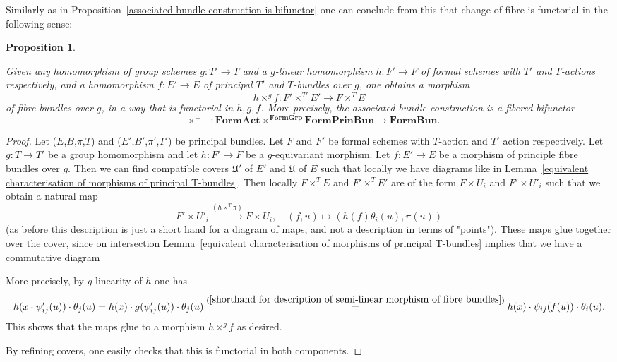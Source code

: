 \documentclass[11pt,oneside]{amsart}
\newtheorem{proposition}[theorem]{Proposition}
\theoremstyle{definition}
\theoremstyle{remark}
\begin{document}
	
	Similarly as in Proposition~\ref{associated bundle construction is bifunctor} one can conclude from this that change of fibre is functorial in the following sense:
	
	\begin{proposition}\label{associated bundle construction in the semi-linear case is a sort of fibered bifunctor}
		
		Given any homomorphism of group schemes $g:T'\rightarrow T$ and a $g$-linear homomorphism $h:F'\rightarrow F$ of formal schemes with $T'$ and $T$-actions respectively, and a homomorphism $f:E'\rightarrow E$ of principal $T'$ and $T$-bundles over $g$, one obtains a morphism
		\[h\times^g f : F'\times^{T'}E'\rightarrow F\times^T E\]
		of fibre bundles over $g$, in a way that is functorial in $h,g,f$. 
		More precisely, the associated bundle construction is a fibered bifunctor
		\[-\times^{-}-: \mathbf{FormAct} \times^{\mathbf{FormGrp}} \mathbf{FormPrinBun}\rightarrow \mathbf{FormBun}. \]
	\end{proposition}
	\begin{proof}
		Let ($E$,$B$,$\pi$,$T$) and ($E'$,$B'$,$\pi'$,$T'$) be principal bundles. Let $F$ and $F'$ be formal schemes with $T$-action and $T'$ action respectively. Let $g:T\rightarrow T'$ be a group homomorphism and let $h:F'\rightarrow F$ be a $g$-equivariant morphism.
		Let $f:E'\rightarrow E$ be a morphism of principle fibre bundles over $g$.
		Then we can find compatible covers $\mathfrak U'$ of $E'$ and $\mathfrak U$ of $E$ such that locally we have diagrams like in Lemma~\ref{equivalent characterisation of morphisms of principal T-bundles}. Then locally $F\times^T E$ and $F'\times^T E'$ are of the form $F\times U_i$ and $F'\times U'_i$ such that we obtain a natural map
		\[F'\times U'_i\xrightarrow{(h\times^T\pi)} F\times U_i, \quad (f,u)\mapsto (h(f)\theta_i(u),\pi(u))\]
		(as before this description is just a short hand for a diagram of maps, and not a description in terms of "points"). These maps glue together over the cover, since on intersection Lemma~\ref{equivalent characterisation of morphisms of principal T-bundles} implies that we have a commutative diagram
		\begin{center}
		\end{center}
		More precisely, by $g$-linearity of $h$ one has
		\[h(x\cdot\psi_{ij}'(u))\cdot \theta_j(u)  =  h(x)\cdot g(\psi_{ij}'(u))\cdot \theta_j(u)  \stackrel{(\ref{shorthand for description of semi-linear morphism of fibre  bundles})}{=} h(x)\cdot \psi_{ij}(f(u))\cdot \theta_i(u).\]
		This shows that the maps glue to a morphism $h\times^g f$ as desired.
		
		By refining covers, one easily checks that this is functorial in both components.
	\end{proof}
	
\end{document}
